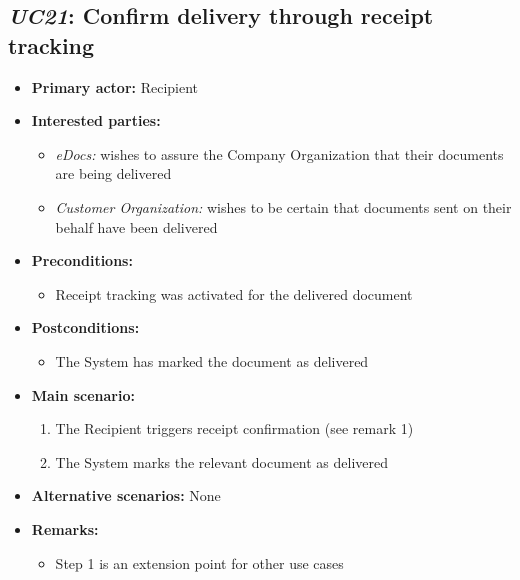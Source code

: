 \documentclass[a4paper,10pt]{article}
\begin{document}
\subsection{\emph{UC21}: Confirm delivery through receipt tracking}
\begin{itemize}
	\item \textbf{Primary actor:} Recipient
	\item \textbf{Interested parties:} 
	\begin{itemize}
		\item \textit{eDocs:} wishes to assure the Company Organization that their documents are being delivered
		\item \textit{Customer Organization:} wishes to be certain that documents sent on their behalf have been delivered
	\end{itemize}
	
	\item \textbf{Preconditions:}
	\begin{itemize}
		\item Receipt tracking was activated for the delivered document
	\end{itemize}
	
	\item \textbf{Postconditions:}
	\begin{itemize}
		\item The System has marked the document as delivered
	\end{itemize}
	
	\item \textbf{Main scenario:} 
	\begin{enumerate}
		\item The Recipient triggers receipt confirmation (see remark 1)
		\item The System marks the relevant document as delivered
	\end{enumerate}
	
	\item \textbf{Alternative scenarios:} 
	None
	
	\item \textbf{Remarks:}
	\begin{itemize}
		\item Step 1 is an extension point for other use cases
	\end{itemize}
\end{itemize}
\end{document}
